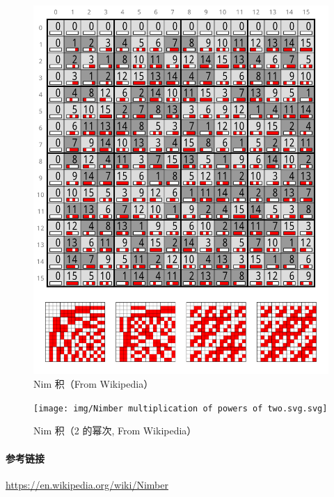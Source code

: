 \begin{figure}
    \label{img:nim-prod}
    \includegraphics{img/Nimber multiplication.svg}
    \caption{Nim 积（From Wikipedia）}
\end{figure}

\begin{figure}
    \label{img:nim-prod-pow2}
    \texttt{[image: img/Nimber multiplication of powers of two.svg.svg]}
    \caption{Nim 积（2 的幂次, From Wikipedia）}
\end{figure}

\paragraph{参考链接}

\url{https://en.wikipedia.org/wiki/Nimber}
